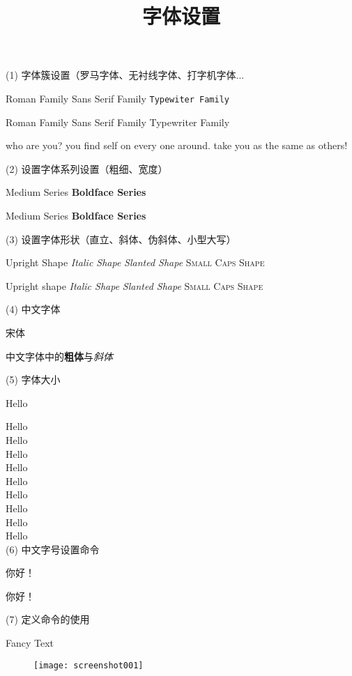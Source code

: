 \documentclass[UTF8,12pt]{article}
\title{\heiti 字体设置}
\newcommand{\myfont}{\textsf{Fancy Text}}%
\begin{document}
	\maketitle
    (1) 字体簇设置（罗马字体、无衬线字体、打字机字体...
	
	\textrm{Roman Family}  \textsf{Sans Serif Family}
	\texttt{Typewiter Family}
	
	{\rmfamily Roman Family}  {\sffamily Sans Serif Family}
	{\ttfamily Typewriter Family}
	
	{\sffamily who are you? you find self on every one around. take you as the same as others!}

	(2) 设置字体系列设置（粗细、宽度）
	
	\textmd{Medium Series}   \textbf{Boldface Series}
	
	{\mdseries Medium Series}    {\bfseries Boldface Series}
	
	(3) 设置字体形状（直立、斜体、伪斜体、小型大写）
	
	\textup{Upright Shape} \textit{Italic Shape} \textsl{Slanted Shape}  \textsc{Small Caps Shape}
	
	{\upshape Upright shape} {\itshape Italic Shape}
	{\slshape Slanted Shape} {\scshape Small Caps Shape}
	
	(4) 中文字体
	
	{\songti 宋体}   
	
	中文字体中的\textbf{粗体}与\textit{斜体}
	
	(5) 字体大小
	
	{\tiny         Hello}
	
	{\scriptsize   Hello}\\
	{\footnotesize Hello}\\
	{\small        Hello}\\
	{\normalsize   Hello}\\
	{\large        Hello}\\
	{\Large        Hello}\\
	{\LARGE        Hello}\\
	{\huge         Hello}\\
	{\Huge         Hello}\\
	
	(6) 中文字号设置命令
	
	 你好！%
	
	 你好！
	
	(7) 定义命令的使用
	
	\myfont
	
	\begin{figure}[b]
	\centering
	\texttt{[image: screenshot001]}
	\caption{}
	\label{fig:screenshot001}
    \end{figure}
\end{document}
